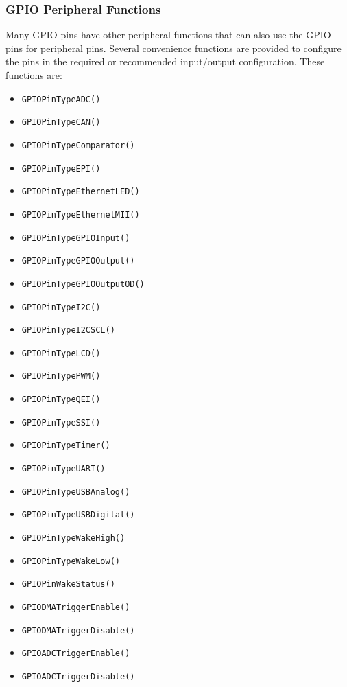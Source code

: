 \documentclass{article}
\begin{document}
\subsubsection{GPIO Peripheral Functions}
Many GPIO pins have other peripheral functions that can also use the
GPIO pins for peripheral pins. Several convenience functions are
provided to configure the pins in the required or recommended
input/output configuration. These functions are:
\begin{itemize}
    \item \texttt{GPIOPinTypeADC()}
    \item \texttt{GPIOPinTypeCAN()}
    \item \texttt{GPIOPinTypeComparator()}
    \item \texttt{GPIOPinTypeEPI()}
    \item \texttt{GPIOPinTypeEthernetLED()}
    \item \texttt{GPIOPinTypeEthernetMII()}
    \item \texttt{GPIOPinTypeGPIOInput()}
    \item \texttt{GPIOPinTypeGPIOOutput()}
    \item \texttt{GPIOPinTypeGPIOOutputOD()}
    \item \texttt{GPIOPinTypeI2C()}
    \item \texttt{GPIOPinTypeI2CSCL()}
    \item \texttt{GPIOPinTypeLCD()}
    \item \texttt{GPIOPinTypePWM()}
    \item \texttt{GPIOPinTypeQEI()}
    \item \texttt{GPIOPinTypeSSI()}
    \item \texttt{GPIOPinTypeTimer()}
    \item \texttt{GPIOPinTypeUART()}
    \item \texttt{GPIOPinTypeUSBAnalog()}
    \item \texttt{GPIOPinTypeUSBDigital()}
    \item \texttt{GPIOPinTypeWakeHigh()}
    \item \texttt{GPIOPinTypeWakeLow()}
    \item \texttt{GPIOPinWakeStatus()}
    \item \texttt{GPIODMATriggerEnable()}
    \item \texttt{GPIODMATriggerDisable()}
    \item \texttt{GPIOADCTriggerEnable()}
    \item \texttt{GPIOADCTriggerDisable()}
\end{itemize}
\end{document}
